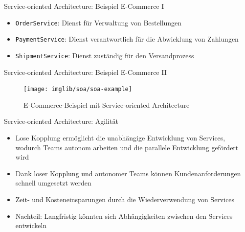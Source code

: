 \begin{frame}{Service-oriented Architecture: Beispiel E-Commerce I}
  \begin{itemize}
    \item \texttt{OrderService}: Dienst für Verwaltung von Bestellungen
    \item \texttt{PaymentService}: Dienst verantwortlich für die Abwicklung von Zahlungen
    \item \texttt{ShipmentService}: Dienst zuständig für den Versandprozess
  \end{itemize}
\end{frame}

\begin{frame}{Service-oriented Architecture: Beispiel E-Commerce II}
  \begin{figure}[!h]
    \centering
    \texttt{[image: imglib/soa/soa-example]}
    \caption{E-Commerce-Beispiel mit Service-oriented Architecture}
    \label{fig:soaecommerce}
  \end{figure}
\end{frame}

\begin{frame}{Service-oriented Architecture: Agilität}
  \begin{itemize}
    \item Lose Kopplung ermöglicht die unabhängige Entwicklung von Services, wodurch Teams autonom arbeiten und die parallele Entwicklung gefördert wird
    \item Dank loser Kopplung und autonomer Teams können Kundenanforderungen schnell umgesetzt werden
    \item Zeit- und Kosteneinsparungen durch die Wiederverwendung von Services
    \item Nachteil: Langfristig könnten sich Abhängigkeiten zwischen den Services entwickeln
    \end{itemize}
\end{frame}
